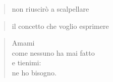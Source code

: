 
\begin{verse}
    \hfill non riuscirò a scalpellare
\end{verse}
\vspace{-0.9cm}
\begin{verse}
    \hfill il concetto che voglio esprimere
\end{verse}

\begin{verse}
    Amami\\
    come nessuno ha mai fatto\\
    e tienimi:\\
    ne ho bisogno.
\end{verse}